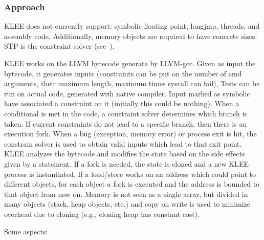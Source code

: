 \documentclass[10pt, a4paper]{article}
\begin{document}
\subsubsection{Approach}

KLEE does not currently support: symbolic floating point, longjmp, threads, and assembly code. Additionally, memory objects are required to have concrete sizes. STP is the constraint solver (see~\cite{EXE-CCS06}).

KLEE works on the LLVM bytecode generate by LLVM-gcc. Given as input the bytecode, it generates inputs (constraints can be put on the number of cmd arguments, their maximum length, maximum times syscall can fail), Tests can be run on actual code, generated with native compiler. Input marked as symbolic have associated a constraint on it (initially this could be nothing). When a conditional is met in the code, a constraint solver determines which branch is taken. If current constraints do not lead to a specific branch, then there is an execution fork. When a bug (exception, memory error) or process exit is hit, the constrain solver is used to obtain valid inputs which lead to that exit point. KLEE analyzes the bytecode and modifies the state based on the side effects given by a statement. If a fork is needed, the state is cloned and a new KLEE process is instantiated. If a load/store works on an address which could point to different objects, for each object a fork is executed and the address is bounded to that object from now on. Memory is not seen as a single array, but divided in many objects (stack, heap objects, etc.) and copy on write is used to minimize overhead due to cloning (e.g., cloning heap has constant cost).

Some aspects:
\end{document}
